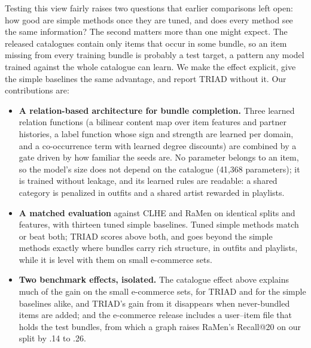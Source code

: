 \documentclass[runningheads]{llncs}
\begin{document}
Testing this view fairly raises two questions that earlier comparisons left open: how good are simple methods once
they are tuned, and does every method see the same information? The second matters more than one might expect. The
released catalogues contain only items that occur in some bundle, so an item missing from every training bundle is
probably a test target, a pattern any model trained against the whole catalogue can learn. We make
the effect explicit, give the simple baselines the same advantage, and report TRIAD without it. Our contributions are:
\begin{itemize}
\item \textbf{A relation-based architecture for bundle completion.} Three learned relation functions (a bilinear
content map over item features and partner histories, a label function whose sign and strength are learned per
domain, and a co-occurrence term with learned degree discounts) are combined by a gate driven by how familiar the seeds
are. No parameter belongs to an item, so the model's size does not depend on the catalogue (41,368 parameters); it is
trained without leakage, and its learned rules are readable: a shared category is penalized in outfits and a shared
artist rewarded in playlists.
\item \textbf{A matched evaluation} against CLHE and RaMen on identical splits and features, with thirteen tuned
simple baselines. Tuned simple methods match or beat both; TRIAD scores above both, and goes beyond the simple methods
exactly where bundles
carry rich structure, in outfits and playlists, while it is level with them on small e-commerce sets.
\item \textbf{Two benchmark effects, isolated.} The catalogue effect above explains much of the gain on the small
e-commerce sets, for TRIAD and for the simple baselines alike, and TRIAD's gain from it disappears when never-bundled
items are added; and the e-commerce release includes a user--item
file that holds the test bundles, from which a graph raises RaMen's Recall@20 on our split by .14 to .26.
\end{itemize}
\end{document}
